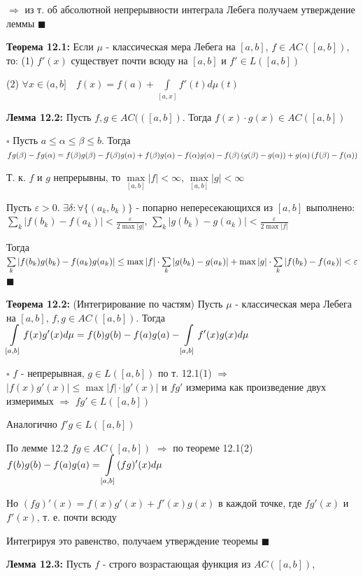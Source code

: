 \documentclass[a4paper]{report}
\newcommand*{\hm}[1]{#1\nobreak\discretionary{}%
            {\hbox{$\mathsurround=0pt #1$}}{}}
\begin{document}
$\Rightarrow$ из т. об абсолютной непрерывности интеграла Лебега получаем утверждение леммы $\blacksquare$
\bigskip

\noindent\textbf{Теорема 12.1:} Если $\mu$ - классическая мера Лебега на $[a,b]$, $f\in AC([a,b])$, то: (1) $f'(x)$ существует почти всюду на $[a,b]$ и $f'\in L([a,b])$

(2) $\forall x\in (a,b]\quad f(x)=f(a)+\displaystyle\int\limits_{[a,x]}f'(t)d\mu(t)$
\bigskip

\noindent\textbf{Лемма 12.2:} Пусть $f,g\in AC(([a,b])$. Тогда $f(x)\cdot g(x)\in AC([a,b])$

\noindent $\square$ Пусть $a\le\alpha\le\beta\le b$. Тогда $fg(\beta)-fg(\alpha)=f(\beta)g(\beta)-f(\beta)g(\alpha)\hm+f(\beta)g(\alpha)-f(\alpha)g(\alpha)-f(\beta)\left(g(\beta)-g(\alpha)\right)+g(\alpha)\left(f(\beta)-f(\alpha)\right)$

Т. к. $f$ и $g$ непрерывны, то $\max\limits_{[a,b]}|f|<\infty$, $\max\limits_{[a,b]}|g|<\infty$

Пусть $\varepsilon>0$. $\exists\delta\colon\forall\{(a_k,b_k)\}$ - попарно непересекающихся из $[a,b]$ выполнено:
$\sum\limits_k|f(b_k)-f(a_k)|<\frac{\varepsilon}{2\max|g|}$, $\sum\limits_k|g(b_k)-g(a_k)|<\frac{\varepsilon}{2\max|f|}$

Тогда $\sum\limits_k|f(b_k)g(b_k)-f(a_k)g(a_k)|\le\max|f|\cdot\sum\limits_k|g(b_k)-g(a_k)|+\max|g|\hm\cdot\sum\limits_k|f(b_k)-f(a_k)|<\varepsilon$ $\blacksquare$
\bigskip

\noindent\textbf{Теорема 12.2:} (Интегрирование по частям) Пусть $\mu$ - классическая мера Лебега на $[a,b]$, $f,g\in AC([a,b])$. Тогда $\displaystyle\int\limits_{[a,b]}f(x)g'(x)d\mu=f(b)g(b)-f(a)g(a)\hm-\displaystyle\int\limits_{[a,b]}f'(x)g(x)d\mu$

\noindent $\square$ $f$ - непрерывная, $g\in L([a,b])$  по т. 12.1(1) $\Rightarrow$ $|f(x)g'(x)|\le\max|f|\cdot|g'(x)|$ и $fg'$ измерима как произведение двух измеримых $\Rightarrow$ $fg'\in L([a,b])$

Аналогично $f'g\in L([a,b])$

По лемме 12.2 $fg\in AC([a,b])$ $\Rightarrow$ по теореме 12.1(2) $f(b)g(b)-f(a)g(a)\hm=\displaystyle\int\limits_{[a,b]}(fg)'(x)d\mu$

\noindent Но $(fg)'(x)=f(x)g'(x)+f'(x)g(x)$ в каждой точке, где $fg'(x)$ и $f'(x)$, т. е. почти всюду

Интегрируя это равенство, получаем утверждение теоремы $\blacksquare$
\bigskip

\noindent\textbf{Лемма 12.3:} Пусть $f$ - строго возрастающая функция из $AC([a,b])$,
\end{document}
